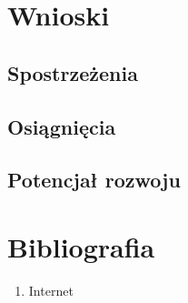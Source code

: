 \documentclass[12pt,a4paper]{article}
\begin{document}
\newpage
\section{Wnioski}
    \subsection{Spostrzeżenia}
    \subsection{Osiągnięcia}
    \subsection{Potencjał rozwoju}


\newpage
\section{Bibliografia}
\begin{enumerate}
	\item Internet
\end{enumerate}
\end{document}
